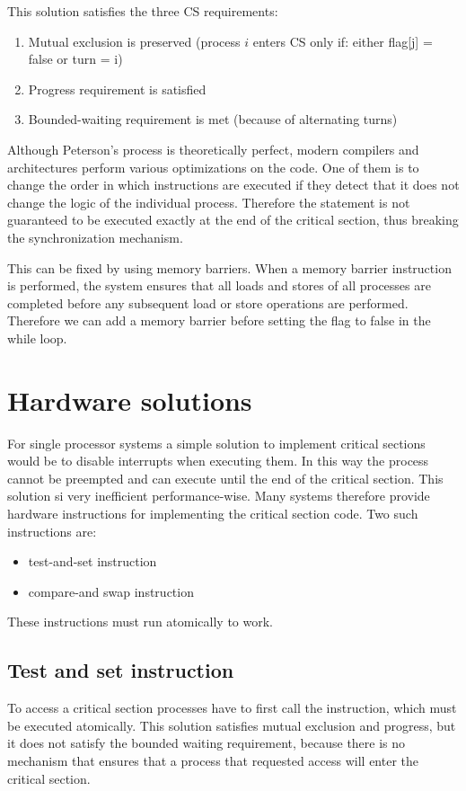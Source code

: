 
This solution satisfies the three CS requirements:
\begin{enumerate}
    \item Mutual exclusion is preserved (process $i$ enters CS only if: either flag[j] = false or turn = i)
    \item Progress requirement is satisfied
    \item Bounded-waiting requirement is met (because of alternating turns)
\end{enumerate}

Although Peterson's process is theoretically perfect, modern compilers and architectures perform various optimizations on the code. One of them is to change the order in which instructions are executed if they detect that it does not change the logic of the individual process. Therefore the  statement is not guaranteed to be executed exactly at the end of the critical section, thus breaking the synchronization mechanism.

This can be fixed by using memory barriers. When a memory barrier instruction is performed, the system ensures that all loads and stores of all processes are completed before any subsequent load or store operations are performed. Therefore we can add a memory barrier before setting the flag to false in the while loop.

\section{Hardware solutions}
For single processor systems a simple solution to implement critical sections would be to disable interrupts when executing them. In this way the process cannot be preempted and can execute until the end of the critical section. This solution si very inefficient performance-wise. Many systems therefore provide hardware instructions for implementing the critical section code. Two such instructions are:
\begin{itemize}
    \item test-and-set instruction
    \item compare-and swap instruction
\end{itemize}
These instructions must run atomically to work.

\subsection{Test and set instruction}
To access a critical section processes have to first call the  instruction, which must be executed atomically.
This solution satisfies mutual exclusion and progress, but it does not satisfy the bounded waiting requirement, because there is no mechanism that ensures that a process that requested access will enter the critical section.


